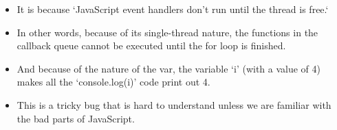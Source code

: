 \begin{frame}[fragile]{}

\begin{itemize}
	\item It is because `JavaScript event handlers don't run until the thread is free.`
	\item In other words, because of its single-thread nature, the functions in the callback queue cannot be executed until the for loop is finished.
	\item And because of the nature of the var, the variable `i' (with a value of 4) makes all the `console.log(i)' code print out 4. 
	\item This is a tricky bug that is hard to understand unless we are familiar with the bad parts of JavaScript. 
\end{itemize}
\end{frame}

